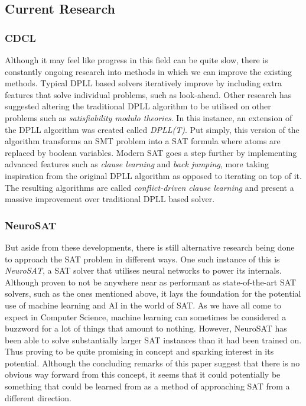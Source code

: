 \documentclass{article}
\begin{document}
\subsection{Current Research}
\subsubsection{CDCL}
Although it may feel like progress in this field can be quite slow, there is constantly ongoing research into methods in which we
can improve the existing methods. Typical DPLL based solvers iteratively improve by including extra features that solve individual
problems, such as look-ahead. Other research has suggested altering the traditional DPLL algorithm to be utilised on other
problems such as \textit{satisfiability modulo theories}. In this instance, an extension of the DPLL algorithm was created called
\textit{DPLL(T)}. Put simply, this version of the algorithm transforms an SMT problem into a SAT formula where atoms are replaced
by boolean variables. Modern SAT goes a step further by implementing advanced features such as \textit{clause learning} and
\textit{back jumping}, more taking inspiration from the original DPLL algorithm as opposed to iterating on top of it. The
resulting algorithms are called \textit{conflict-driven clause learning} and present a massive improvement over traditional DPLL
based solver.

\subsubsection{NeuroSAT}
But aside from these developments, there is still alternative research being done to approach the SAT problem in different ways.
One such instance of this is \textit{NeuroSAT}, a SAT solver that utilises neural networks to power its internals. Although proven
to not be anywhere near as performant as state-of-the-art SAT solvers, such as the ones mentioned above, it lays the foundation
for the potential use of machine learning and AI in the world of SAT. As we have all come to expect in Computer Science, machine
learning can sometimes be considered a buzzword for a lot of things that amount to nothing. However, NeuroSAT has been able to
solve substantially larger SAT instances than it had been trained on\cite{neuro}. Thus proving to be quite promising in concept
and sparking interest in its potential. Although the concluding remarks of this paper suggest that there is no obvious way forward
from this concept, it seems that it could potentially be something that could be learned from as a method of approaching SAT from
a different direction.
\end{document}
